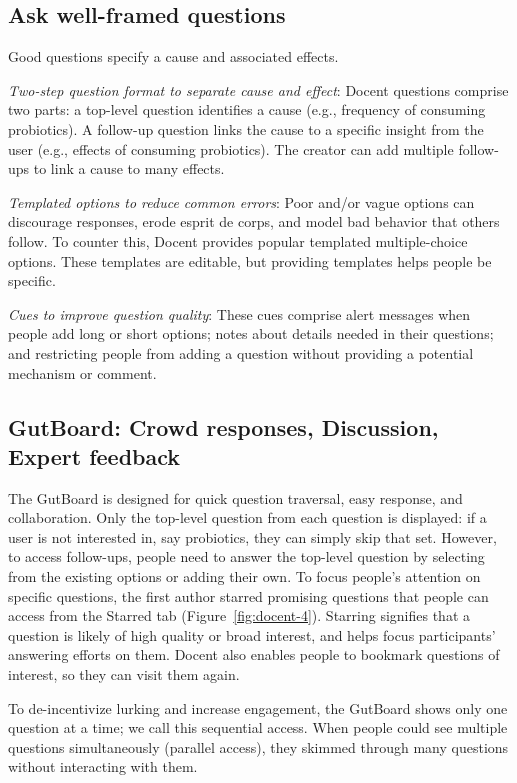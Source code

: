 \subsection{Ask well-framed questions }
Good questions specify a cause and associated effects.

\textit{Two-step question format to separate cause and effect}: Docent questions comprise two parts: a top-level question identifies a cause (e.g., frequency of consuming probiotics). A follow-up question links the cause to a specific insight from the user (e.g., effects of consuming probiotics). The creator can add multiple follow-ups to link a cause to many effects.

\textit{Templated options to reduce common errors}: Poor and/or vague options can discourage responses, erode esprit de corps, and model bad behavior that others follow. To counter this, Docent provides popular templated multiple-choice options. These templates are editable, but providing templates helps people be specific.

\textit{Cues to improve question quality}: These cues comprise alert messages when people add long or short options; notes about details needed in their questions; and restricting people from adding a question without providing a potential mechanism or comment.

\subsection{GutBoard: Crowd responses, Discussion, Expert feedback}
The GutBoard is designed for quick question traversal, easy response, and collaboration. Only the top-level question from each question is displayed: if a user is not interested in, say probiotics, they can simply skip that set. However, to access follow-ups, people need to answer the top-level question by selecting from the existing options or adding their own. To focus people’s attention on specific questions, the first author starred promising questions that people can access from the Starred tab (Figure~\ref{fig:docent-4}). Starring signifies that a question is likely of high quality or broad interest, and helps focus participants’ answering efforts on them. Docent also enables people to bookmark questions of interest, so they can visit them again. 

To de-incentivize lurking and increase engagement, the GutBoard shows only one question at a time; we call this sequential access. When people could see multiple questions simultaneously (parallel access), they skimmed through many questions without interacting with them. 

